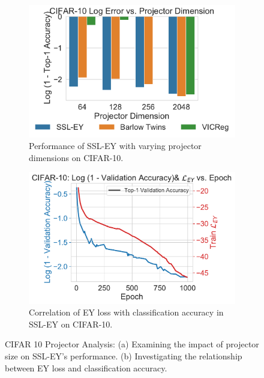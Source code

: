 \begin{figure}[H]
    \begin{subfigure}[b]{0.47\textwidth}
        \centering
        \includegraphics[width=\textwidth]{figures/SSL/cifar10_proj_dim_log_error}
        \caption{Performance of SSL-EY with varying projector dimensions on CIFAR-10.}
        \label{fig:ssl_projector_dimensions_10}
    \end{subfigure}
    \hfill
    \begin{subfigure}[b]{0.47\textwidth}
        \centering
        \includegraphics[width=\textwidth]{figures/SSL/cifar10_corr_vs_acc_log_error}
        \caption{Correlation of EY loss with classification accuracy in SSL-EY on CIFAR-10.}
        \label{fig:ssl_learning_curve_cifar10_vs_corr}
    \end{subfigure}
    \caption{CIFAR 10 Projector Analysis: (a) Examining the impact of projector size on SSL-EY's performance. (b) Investigating the relationship between EY loss and classification accuracy.}
    \label{fig:ssl_projector_cifar_10}
\end{figure}


